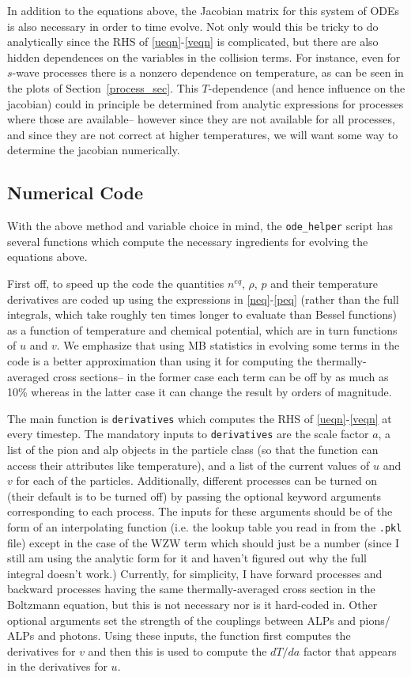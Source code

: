 \documentclass[superscriptaddress,nofootinbib,notitlepage,onecolumn]{revtex4-1}
\newcommand{\code}[1]{\texttt{#1}}
\begin{document}
In addition to the equations above, the Jacobian matrix for this system of ODEs is also necessary in order to time evolve. Not only would this be tricky to do analytically since the RHS of \eqref{ueqn}-\eqref{veqn} is complicated, but there are also hidden dependences on the variables in the collision terms. For instance, even for $s$-wave processes there is a nonzero dependence on temperature, as can be seen in the plots of Section~\ref{process_sec}. This $T$-dependence (and hence influence on the jacobian) could in principle be determined from analytic expressions for processes where those are available-- however since they are not available for all processes, and since they are not correct at higher temperatures, we will want some way to determine the jacobian numerically.
\subsection{Numerical Code}
With the above method and variable choice in mind, the \code{ode\_helper} script has several functions which compute the necessary ingredients for evolving the equations above. 

First off, to speed up the code the quantities $n^{eq}$, $\rho$, $p$ and their temperature derivatives are coded up using the expressions in \eqref{neq}-\eqref{peq} (rather than the full integrals, which take roughly ten times longer to evaluate than Bessel functions) as a function of temperature and chemical potential, which are in turn functions of $u$ and $v$. We emphasize that using MB statistics in evolving some terms in the code is a better approximation than using it for computing the thermally-averaged cross sections-- in the former case each term can be off by as much as 10\% whereas in the latter case it can change the result by orders of magnitude.
 
The main function is \code{derivatives} which computes the RHS of \eqref{ueqn}-\eqref{veqn} at every timestep. The mandatory inputs to \code{derivatives} are the scale factor $a$, a list of the pion and alp objects in the particle class (so that the function can access their attributes like temperature), and a list of the current values of $u$ and $v$ for each of the particles. Additionally, different processes can be turned on (their default is to be turned off) by passing the optional keyword arguments corresponding to each process. The inputs for these arguments should be of the form of an interpolating function (i.e. the lookup table you read in from the \code{.pkl} file) except in the case of the WZW term which should just be a number (since I still am using the analytic form for it and haven't figured out why the full integral doesn't work.) Currently, for simplicity, I have forward processes and backward processes having the same thermally-averaged cross section in the Boltzmann equation, but this is not necessary nor is it hard-coded in. Other optional arguments set the strength of the couplings between ALPs and pions/ ALPs and photons. Using these inputs, the function first computes the derivatives for $v$ and then this is used to compute the $d T/d a$ factor that appears in the derivatives for $u$. 
\end{document}

